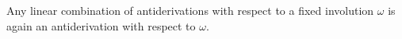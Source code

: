 Any linear combination of antiderivations with respect to a fixed involution $\omega$ is again an antiderivation with respect to $\omega$.
